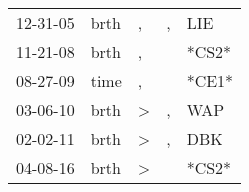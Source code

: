 \begin{supertabular}{p{0.07\textwidth}p{0.06\textwidth}p{0.02\textwidth}p{0.02\textwidth}p{0.06\textwidth}}
 12-31-05\textsuperscript{} &  brth\textsuperscript{} &             , &  , &  LIE\textsuperscript{} \\
 11-21-08\textsuperscript{} &  brth\textsuperscript{} &             , &    &                  *CS2* \\
 08-27-09\textsuperscript{} &  time\textsuperscript{} &             , &    &                  *CE1* \\
 03-06-10\textsuperscript{} &  brth\textsuperscript{} &  \textgreater &  , &  WAP\textsuperscript{} \\
 02-02-11\textsuperscript{} &  brth\textsuperscript{} &  \textgreater &  , &  DBK\textsuperscript{} \\
 04-08-16\textsuperscript{} &  brth\textsuperscript{} &  \textgreater &    &                  *CS2* \\
\end{supertabular}

